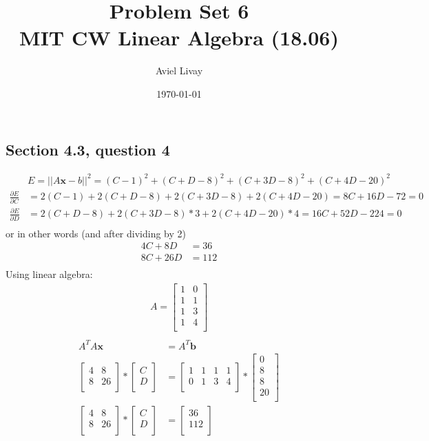 \documentclass[a4paper,11pt]{article}
\title{%
	Problem Set 6\\
	\large MIT CW Linear Algebra (18.06)
}
\author{Aviel Livay}
\date{\today}
\newcommand{\mybf}[1]{\boldsymbol{#1}}
\newcommand{\norm}[1]{\lvert\lvert #1 \rvert\rvert}
\begin{document}
\maketitle

\subsection*{Section 4.3, question 4}
\begin{align*}
&E=\norm{A\mybf{x}-b}^2=(C-1)^2+(C+D-8)^2+(C+3D-8)^2+(C+4D-20)^2 \\
\frac{\partial E}{\partial C} &= 2(C-1)+2(C+D-8)+2(C+3D-8)+2(C+4D-20) = 8C+16D-72=0 \\
\frac{\partial E}{\partial D} &= 2(C+D-8)+2(C+3D-8)*3+2(C+4D-20)*4 = 16C+52D-224=0 \\
\end{align*}
or in other words (and after dividing by 2)
\begin{align*}
4C+8D&=36 \\
8C+26D&=112 \\
\end{align*}
Using linear algebra:
\begin{align*}
A = 
\begin{bmatrix}
1 & 0 \\
1 & 1 \\
1 & 3 \\
1 & 4 \\
\end{bmatrix} \\
\end{align*}
\begin{align*}
A^TA\mybf{x}&=A^T\mybf{b} \\
\begin{bmatrix}
4 & 8 \\
8 & 26 \\
\end{bmatrix}
*
\begin{bmatrix}
C \\
D \\
\end{bmatrix}
&=
\begin{bmatrix}
1 & 1 & 1 & 1 \\
0 & 1 & 3 & 4 \\
\end{bmatrix} 
*
\begin{bmatrix}
0 \\
8 \\
8 \\
20 \\
\end{bmatrix} \\
\begin{bmatrix}
4 & 8 \\
8 & 26 \\
\end{bmatrix}
*
\begin{bmatrix}
C \\
D \\
\end{bmatrix}
&=
\begin{bmatrix}
36 \\
112 \\
\end{bmatrix} 
\end{align*}
\end{document}

